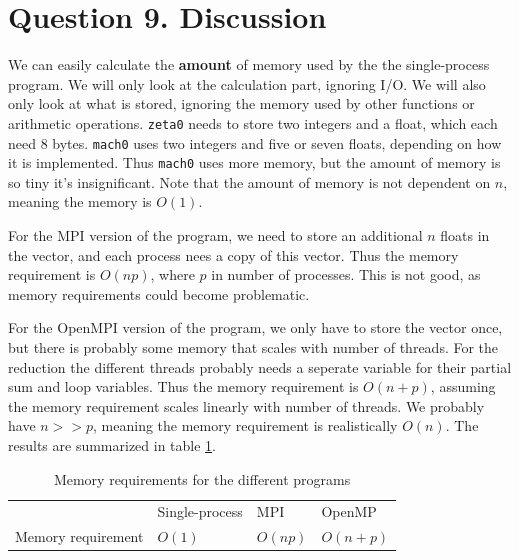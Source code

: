 \documentclass[12pt]{article}
\begin{document}
\section{Question 9. Discussion}

We can easily calculate the \textbf{amount} of memory used by the the single-process program. 
We will only look at the calculation part, ignoring I/O. We will also only look at what is stored, ignoring
the memory used by other functions or arithmetic operations.
\texttt{zeta0} needs to store two integers and a float, which each need $8$ bytes. \texttt{mach0} uses two integers and five or seven floats, depending on how it is implemented. Thus \texttt{mach0}
uses more memory, but the amount of memory is so tiny it's insignificant. Note that the amount of memory is not dependent on $n$, meaning the memory is $O(1)$.

For the MPI version of the program, we need to store an additional $n$ floats in the vector, and each process nees a copy of this vector. Thus the memory requirement is $O(np)$, where $p$
in number of processes. This is not good, as memory requirements could become problematic.

For the OpenMPI version of the program, we only have to store the vector once, but there is probably some memory that scales with number of threads. For the reduction the different threads
probably needs a seperate variable for their partial sum and loop variables. Thus the memory requirement is $O(n+p)$, assuming the memory requirement scales linearly with number of threads.  
We probably have $n >> p$, meaning the memory requirement is realistically $O(n)$. The results are summarized in table \ref{tab:memory}.
\begin{table}[]
\begin{tabular}{llll}
& Single-process & MPI & OpenMP \\
    Memory requirement & $O(1)$ & $O(np)$ & $O(n + p)$ 
\end{tabular}
    \caption{Memory requirements for the different programs}
    \label{tab:memory}
\end{table}
\end{document}
